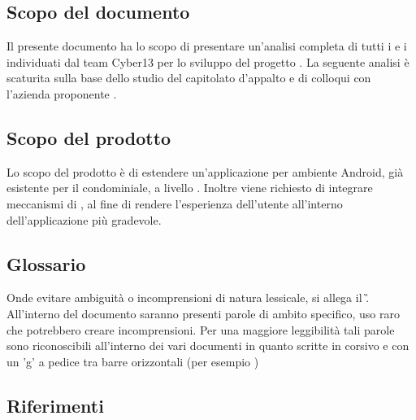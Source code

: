 \subsection{Scopo del documento}
Il presente documento ha lo scopo di presentare un'analisi completa di tutti i  e i  individuati dal team Cyber13 per lo sviluppo del progetto . La seguente analisi è scaturita sulla base dello studio del capitolato d'appalto e di colloqui con l'azienda proponente .

\subsection{Scopo del prodotto}
Lo scopo del prodotto è di estendere un'applicazione per ambiente Android, già esistente per il  condominiale, a livello . Inoltre viene richiesto di integrare meccanismi di , al fine di rendere l'esperienza dell'utente all'interno dell'applicazione più gradevole.

\subsection{Glossario}
Onde evitare ambiguità o incomprensioni di natura lessicale, si allega il \G.
All'interno del documento saranno presenti parole di ambito specifico, uso raro che potrebbero creare incomprensioni. Per una maggiore leggibilità tali parole sono riconoscibili all'interno dei vari documenti in quanto scritte in corsivo e con un 'g' a pedice tra barre orizzontali (per esempio )
\subsection{Riferimenti}

